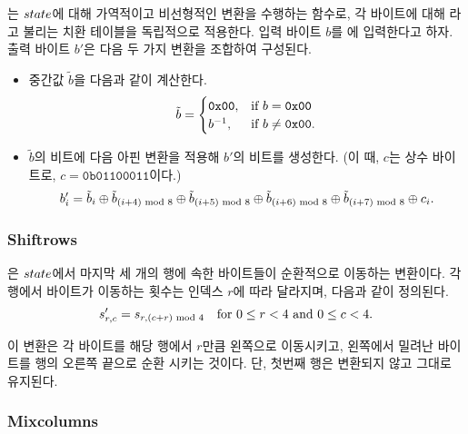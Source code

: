 \documentclass{article}
\begin{document}
\sb 는 $state$에 대해 가역적이고 비선형적인 변환을 수행하는 함수로, 각 바이트에
대해 \SBox 라고 불리는 치환 테이블을 독립적으로 적용한다. 입력 바이트 $b$를 \SBox
에 입력한다고 하자. 출력 바이트 $b'$은 다음 두 가지 변환을 조합하여 구성된다.

\begin{itemize}
    \item 중간값 $\tilde{b}$을 다음과 같이 계산한다.
    $$
    \tilde{b} = \begin{cases} 
            \texttt{0x00}, & \text{if } b = \texttt{0x00} \\ b^{-1}, & \text{if } b \neq \texttt{0x00}. 
        \end{cases}
    $$
    \item $\tilde{b}$의 비트에 다음 아핀 변환을 적용해 $b'$의 비트를 생성한다.
    (이 때, $c$는 상수 바이트로, $c = \texttt{0b01100011}$이다.)
    $$
    b'_i = \tilde{b}_i 
        \oplus \tilde{b}_{(i+4) \text{ mod } 8} 
        \oplus \tilde{b}_{(i+5) \text{ mod } 8} 
        \oplus \tilde{b}_{(i+6) \text{ mod } 8} 
        \oplus \tilde{b}_{(i+7) \text{ mod } 8} \oplus c_i.
    $$
    
\end{itemize}


\subsubsection{Shiftrows}



\sr 은 $state$에서 마지막 세 개의 행에 속한 바이트들이 순환적으로 이동하는 변환이다.
각 행에서 바이트가 이동하는 횟수는 인덱스 $r$에 따라 달라지며, 다음과 같이 정의된다.
$$
    s'_{r,c} = s_{r, (c+r) \text{ mod } 4} \quad \text{for } 0 \leq r < 4 \text{ and } 0 \leq c < 4.
$$

이 변환은 각 바이트를 해당 행에서 $r$만큼 왼쪽으로 이동시키고, 왼쪽에서 밀려난
바이트를 행의 오른쪽 끝으로 순환 시키는 것이다. 단, 첫번째 행은 변환되지 않고
그대로 유지된다.


\subsubsection{Mixcolumns}


\end{document}
